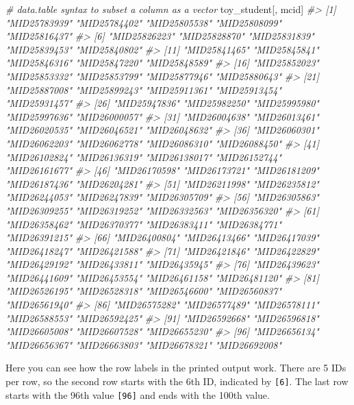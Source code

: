 \documentclass[
]{book}
\newenvironment{Shaded}{\begin{snugshade}}{\end{snugshade}}
\newcommand{\CommentTok}[1]{\textcolor[rgb]{0.56,0.35,0.01}{\textit{#1}}}
\newcommand{\NormalTok}[1]{#1}
\begin{document}
\begin{Shaded}
\begin{Highlighting}[]
\CommentTok{\# data.table syntax to subset a column as a vector}
\NormalTok{toy\_student[, mcid]}
\CommentTok{\#\textgreater{}   [1] "MID25783939" "MID25784402" "MID25805538" "MID25808099" "MID25816437"}
\CommentTok{\#\textgreater{}   [6] "MID25826223" "MID25828870" "MID25831839" "MID25839453" "MID25840802"}
\CommentTok{\#\textgreater{}  [11] "MID25841465" "MID25845841" "MID25846316" "MID25847220" "MID25848589"}
\CommentTok{\#\textgreater{}  [16] "MID25852023" "MID25853332" "MID25853799" "MID25877946" "MID25880643"}
\CommentTok{\#\textgreater{}  [21] "MID25887008" "MID25899243" "MID25911361" "MID25913454" "MID25931457"}
\CommentTok{\#\textgreater{}  [26] "MID25947836" "MID25982250" "MID25995980" "MID25997636" "MID26000057"}
\CommentTok{\#\textgreater{}  [31] "MID26004638" "MID26013461" "MID26020535" "MID26046521" "MID26048632"}
\CommentTok{\#\textgreater{}  [36] "MID26060301" "MID26062203" "MID26062778" "MID26086310" "MID26088450"}
\CommentTok{\#\textgreater{}  [41] "MID26102824" "MID26136319" "MID26138017" "MID26152744" "MID26161677"}
\CommentTok{\#\textgreater{}  [46] "MID26170598" "MID26173721" "MID26181209" "MID26187436" "MID26204281"}
\CommentTok{\#\textgreater{}  [51] "MID26211998" "MID26235812" "MID26244053" "MID26247839" "MID26305709"}
\CommentTok{\#\textgreater{}  [56] "MID26305863" "MID26309255" "MID26319252" "MID26332563" "MID26356320"}
\CommentTok{\#\textgreater{}  [61] "MID26358462" "MID26370377" "MID26383411" "MID26384771" "MID26391215"}
\CommentTok{\#\textgreater{}  [66] "MID26400804" "MID26413466" "MID26417039" "MID26418247" "MID26421588"}
\CommentTok{\#\textgreater{}  [71] "MID26421846" "MID26422829" "MID26429192" "MID26433811" "MID26435945"}
\CommentTok{\#\textgreater{}  [76] "MID26439623" "MID26441609" "MID26453554" "MID26461158" "MID26481120"}
\CommentTok{\#\textgreater{}  [81] "MID26526195" "MID26528318" "MID26546600" "MID26560837" "MID26561940"}
\CommentTok{\#\textgreater{}  [86] "MID26575282" "MID26577489" "MID26578111" "MID26588553" "MID26592425"}
\CommentTok{\#\textgreater{}  [91] "MID26592668" "MID26596818" "MID26605008" "MID26607528" "MID26655230"}
\CommentTok{\#\textgreater{}  [96] "MID26656134" "MID26656367" "MID26663803" "MID26678321" "MID26692008"}
\end{Highlighting}
\end{Shaded}

Here you can see how the row labels in the printed output work. There are 5 IDs per row, so the second row starts with the 6th ID, indicated by \texttt{{[}6{]}}. The last row starts with the 96th value \texttt{{[}96{]}} and ends with the 100th value.
\end{document}
